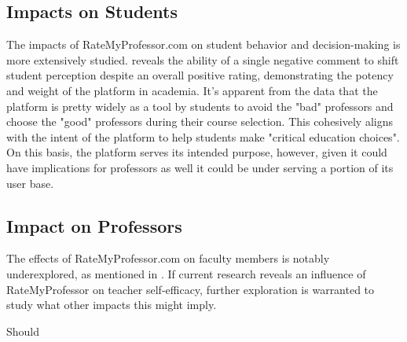 \documentclass[man,12pt]{apa7}
\begin{document}
\subsection*{Impacts on Students}
The impacts of RateMyProfessor.com on student behavior and decision-making is more extensively studied. \textcite{scherr_single_2013} reveals the ability of a single negative comment to shift student perception despite an overall positive rating, demonstrating the potency and weight of the platform in academia. It's apparent from the data that the platform is pretty widely as a tool by students to avoid the "bad" professors and choose the "good" professors during their course selection. This cohesively aligns with the intent of the platform to help students make "critical education choices". On this basis, the platform serves its intended purpose, however, given it could have implications for professors as well it could be under serving a portion of its user base.

\subsection*{Impact on Professors}
The effects of RateMyProfessor.com on faculty members is notably underexplored, as mentioned in \textcite{boswell_ratemyprofessors_2016}.  If current research reveals an influence of RateMyProfessor on teacher self-efficacy, further exploration is warranted to study what other impacts this might imply.

Should 




\end{document}
